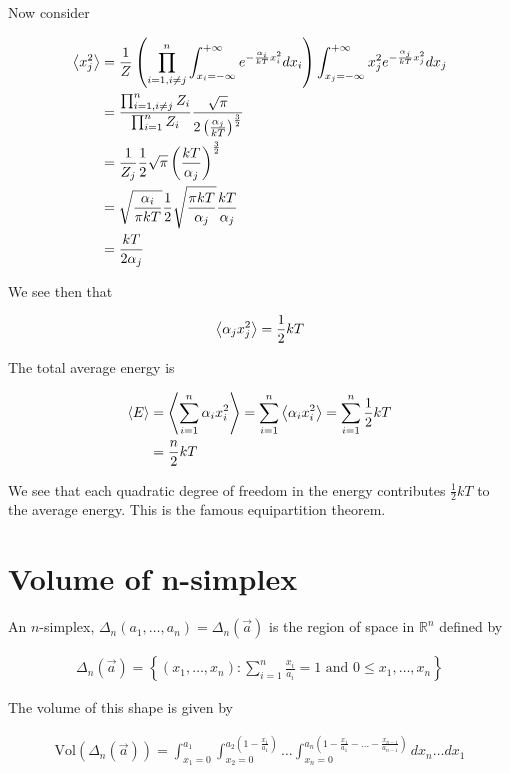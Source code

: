 \documentclass[12pt]{article}
\begin{document}
Now consider

\begin{align}
\Braket{x_j^2} &= \frac{1}{Z}  \left(\prod_{i=1, i\ne j}^n \int_{x_i=-\infty}^{+\infty} e^{-\frac{\alpha_i}{kT} x_i^2} dx_i\right) \int_{x_j=-\infty}^{+\infty} x_j^2 e^{-\frac{\alpha_j}{kT} x_j^2} dx_j\\
&= \frac{\prod_{i=1,i\ne j}^n Z_i}{\prod_{i=1}^n Z_i} \frac{\sqrt{\pi}}{2\left(\frac{\alpha_j}{kT} \right)^{\frac{3}{2}}}\\
&= \frac{1}{Z_j} \frac{1}{2} \sqrt{\pi} \left(\frac{kT}{\alpha_j} \right)^{\frac{3}{2}}\\
&= \sqrt{\frac{\alpha_i}{\pi k T}} \frac{1}{2} \sqrt{\frac{\pi kT}{\alpha_j}} \frac{kT}{\alpha_j}\\
&= \frac{kT}{2\alpha_j}
\end{align}

We see then that

\begin{align}
\Braket{\alpha_j x_j^2} = \frac{1}{2} kT
\end{align}

The total average energy is

\begin{align}
\Braket{E} &= \Braket{\sum_{i=1}^n \alpha_i x_i^2} = \sum_{i=1}^n \Braket{\alpha_i x_i^2} = \sum_{i=1}^n \frac{1}{2} kT\\
&= \frac{n}{2} kT
\end{align}

We see that each quadratic degree of freedom in the energy contributes $\frac{1}{2} kT$ to the average energy. This is the famous equipartition theorem.

\section{Volume of n-simplex}

An $n$-simplex, $\Delta_n(a_1,\ldots,a_n) = \Delta_n(\vec{a})$ is the region of space in $\mathbb{R}^n$ defined by

\begin{align}
\Delta_n(\vec{a}) = \left\{(x_1,\ldots,x_n):\sum_{i=1}^n \frac{x_i}{a_i} = 1 \text{ and } 0\le x_1,\ldots,x_n  \right\}
\end{align}



The volume of this shape is given by

\begin{align}
\text{Vol}(\Delta_n(\vec{a})) = \int_{x_1=0}^{a_1}\int_{x_2=0}^{a_2\left(1-\frac{x_1}{a_1} \right)}\ldots\int_{x_n=0}^{a_n\left(1-\frac{x_1}{a_1} - \ldots - \frac{x_{n-1}}{a_{n-1}} \right)} dx_n\ldots dx_1
\end{align}
\end{document}
